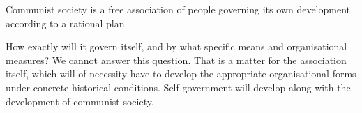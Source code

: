\documentclass[../main]{subfiles}
\begin{document}
Communist society is a free association of people governing its own development according to a rational plan.

How exactly will it govern itself, and by what specific means and organisational measures? We cannot answer this question. That is a matter for the association itself, which will of necessity have to develop the appropriate organisational forms under concrete historical conditions. Self-government will develop along with the development of communist society.
\end{document}
